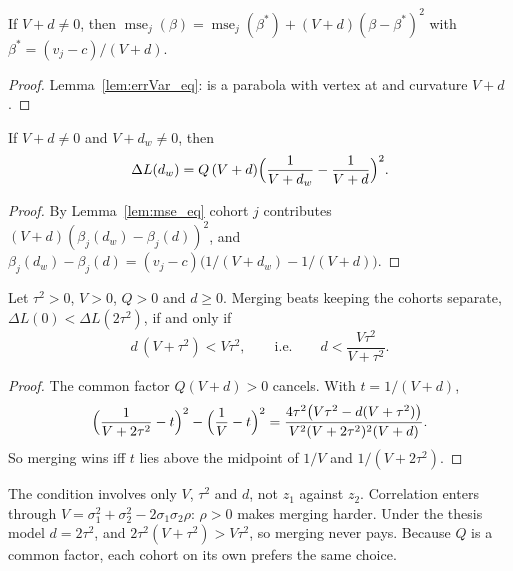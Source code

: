 \begin{lemma}\label{lem:mse_eq}
  \leanok
  If $V + d \ne 0$, then
  $\operatorname{mse}_j(\beta) = \operatorname{mse}_j(\beta^*) + (V + d)(\beta - \beta^*)^2$
  with $\beta^* = (v_j - c)/(V + d)$.
\end{lemma}
\begin{proof}
  \leanok
  Lemma~\ref{lem:errVar_eq}:  is a parabola with vertex at 
  and curvature $V + d$.
\end{proof}

\begin{lemma}\label{lem:excessLoss_eq}
  \leanok
  If $V + d \ne 0$ and $V + d_w \ne 0$, then
  \[
    \Delta L(d_w) = Q\,(V + d)\Bigl(\frac{1}{V + d_w} - \frac{1}{V + d}\Bigr)^2.
  \]
\end{lemma}
\begin{proof}
  \leanok
  By Lemma~\ref{lem:mse_eq} cohort $j$ contributes $(V + d)(\beta_j(d_w) - \beta_j(d))^2$,
  and $\beta_j(d_w) - \beta_j(d) = (v_j - c)\bigl(1/(V + d_w) - 1/(V + d)\bigr)$.
\end{proof}

\begin{theorem}\label{thm:merge_iff}
  \leanok
  Let $\tau^2 > 0$, $V > 0$, $Q > 0$ and $d \ge 0$. Merging beats keeping the
  cohorts separate, $\Delta L(0) < \Delta L(2\tau^2)$, if and only if
  \[
    d\,(V + \tau^2) < V\tau^2, \qquad\text{i.e.}\qquad d < \frac{V\tau^2}{V + \tau^2}.
  \]
\end{theorem}
\begin{proof}
  \leanok
  The common factor $Q(V + d) > 0$ cancels. With $t = 1/(V + d)$,
  \[
    \Bigl(\frac{1}{V + 2\tau^2} - t\Bigr)^2 - \Bigl(\frac1V - t\Bigr)^2
    = \frac{4\tau^2\bigl(V\tau^2 - d(V + \tau^2)\bigr)}{V^2(V + 2\tau^2)^2(V + d)}.
  \]
  So merging wins iff $t$ lies above the midpoint of $1/V$ and $1/(V + 2\tau^2)$.
\end{proof}

\begin{remark}\label{rem:merge_reading}
  The condition involves only $V$, $\tau^2$ and $d$, not $z_1$ against $z_2$.
  Correlation enters through $V = \sigma_1^2 + \sigma_2^2 - 2\sigma_1\sigma_2\rho$:
  $\rho > 0$ makes merging harder. Under the thesis model $d = 2\tau^2$, and
  $2\tau^2(V + \tau^2) > V\tau^2$, so merging never pays. Because $Q$ is a
  common factor, each cohort on its own prefers the same choice.
\end{remark}

